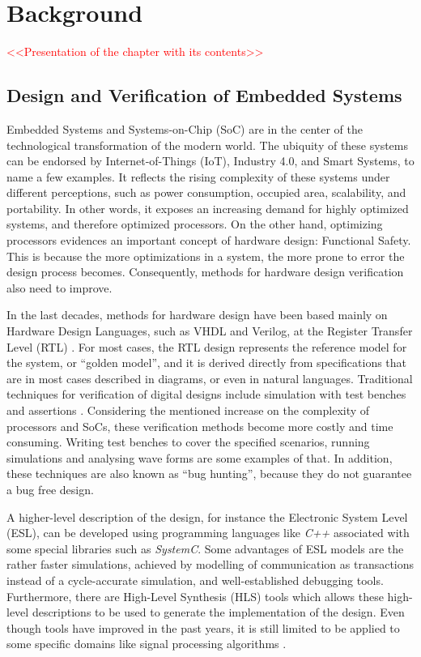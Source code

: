 \chapter{Background}

\textcolor{red}{<<Presentation of the chapter with its contents>>}

\section{Design and Verification of Embedded Systems}

Embedded Systems and Systems-on-Chip (SoC) are in the center of the technological transformation of the modern world. The ubiquity of these systems can be endorsed by Internet-of-Things (IoT), Industry 4.0, and Smart Systems, to name a few examples. It reflects the rising complexity of these systems under different perceptions, such as power consumption, occupied area, scalability, and portability. In other words, it exposes an increasing demand for highly optimized systems, and therefore optimized processors. On the other hand, optimizing processors evidences an important concept of hardware design: Functional Safety. This is because the more optimizations in a system, the more prone to error the design process becomes. Consequently, methods for hardware design verification also need to improve.

In the last decades, methods for hardware design have been based mainly on Hardware Design Languages, such as VHDL and Verilog, at the Register Transfer Level (RTL) \cite{paper-pdd}. For most cases, the RTL design represents the reference model for the system, or “golden model”, and it is derived directly from specifications that are in most cases described in diagrams, or even in natural languages. Traditional techniques for verification of digital designs include simulation with test benches and assertions \cite{paper-symbolic}. Considering the mentioned increase on the complexity of processors and SoCs, these verification methods become more costly and time consuming. Writing test benches to cover the specified scenarios, running simulations and analysing wave forms are some examples of that. In addition, these techniques are also known as “bug hunting”, because they do not guarantee a bug free design. 

A higher-level description of the design, for instance the Electronic System Level (ESL), can be developed using programming languages like \textit{C++} associated with some special libraries such as \textit{SystemC}. Some advantages of ESL models are the rather faster simulations, achieved by modelling of communication as transactions instead of a cycle-accurate simulation, and well-established debugging tools. Furthermore, there are High-Level Synthesis (HLS) tools which allows these high-level descriptions to be used to generate the implementation of the design. Even though  tools have improved in the past years, it is still limited to be applied to some specific domains like signal processing algorithms \cite{paper-pdd}. 

